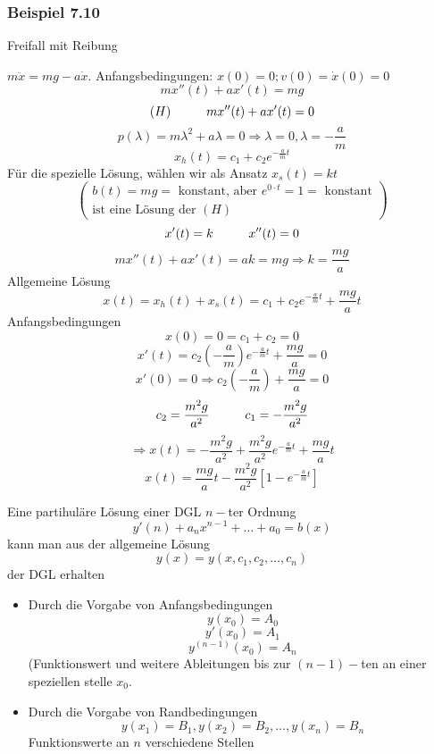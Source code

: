 \begin{enumerate}
\subsubsection*{Beispiel 7.10}
Freifall mit Reibung 
\begin{center}
\end{center}
$m\ddot{x}=mg-a\dot{x}$. Anfangsbedingungen: $x(0)=0; v(0)=\dot{x}(0)=0$
$$mx''(t)+ax'(t)=mg$$
$$(H)\hspace{10mm}mx''(t)+ax'(t)=0$$
$$p(\lambda)=m\lambda^2+a\lambda=0\Rightarrow \lambda=0,\lambda=-\frac{a}{m}$$
$$x_h(t)=c_1+c_2e^{-\frac{a}{m}t}$$
Für die spezielle Lösung, wählen wir als Ansatz $x_s(t)=kt$
\[\left( \begin{array}{l}
b(t) = mg = {\text{ konstant, aber  }}{e^{0 \cdot t}} = 1 = {\text{ konstant}}\\
{\text{ist eine Lösung der }}(H)
\end{array} \right)\]
$$x'(t)=k\hspace{10mm}x''(t)=0$$
$$mx''(t)+ax'(t)=ak=mg\Rightarrow k=\frac{mg}{a}$$
Allgemeine Lösung 
$$x(t)=x_h(t)+x_s(t)=c_1+c_2e^{-\frac{a}{m}t}+\frac{mg}{a}t$$
Anfangsbedingungen
$$x(0)=0=c_1+c_2=0$$
$$x'(t)=c_2\left(-\frac{a}{m}\right)e^{-\frac{a}{m}t}+\frac{mg}{a}=0$$
$$x'(0)=0\Rightarrow c_2\left( -\frac{a}{m}\right) +\frac{mg}{a}=0$$
$$c_2=\frac{m^2g}{a^2}\hspace{10mm}c_1=-\frac{m^2g}{a^2}$$
$$\Rightarrow x(t)=-\frac{m^2g}{a^2}+\frac{m^2g}{a^2}e^{-\frac{a}{m}t}+\frac{mg}{a}t$$
$$x(t)=\frac{mg}{a}t-\frac{m^2g}{a^2}\left[ 1-e^{-\frac{a}{m}t}\right]$$
\end{enumerate}
Eine partihuläre Lösung einer DGL $n-$ter Ordnung $$y'{(n)}+a_nx^{n-1}+\dots+a_0=b(x)$$ kann man aus der allgemeine Lösung 
$$y(x)=y(x,c_1,c_2,\dots,c_n)$$ der DGL erhalten
\begin{itemize}
\item Durch die Vorgabe von Anfangsbedingungen 
$$y(x_0)=A_0$$
$$y'(x_0)=A_1$$
$$y^{(n-1)}(x_0)=A_n$$
(Funktionswert und weitere Ableitungen bis zur $(n-1)-$ten an einer speziellen stelle $x_0$.
\item Durch die Vorgabe von Randbedingungen 
$$y(x_1)=B_1, y(x_2)=B_2, \dots, y(x_n)=B_n$$ Funktionswerte an $n$ verschiedene Stellen
\end{itemize}
